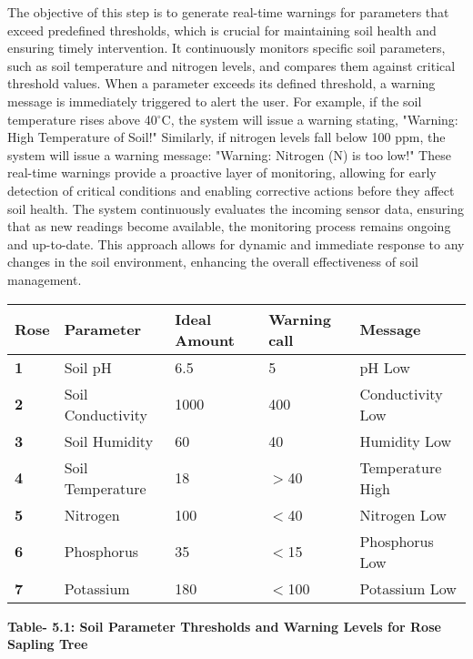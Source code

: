 \documentclass{book} %
\begin{document}
\noindent The objective of this step is to generate real-time warnings for parameters that exceed predefined thresholds, which is crucial for maintaining soil health and ensuring timely intervention. It continuously monitors specific soil parameters, such as soil temperature and nitrogen levels, and compares them against critical threshold values. When a parameter exceeds its defined threshold, a warning message is immediately triggered to alert the user. For example, if the soil temperature rises above 40$\mathrm{{}^\circ}$C, the system will issue a warning stating, "Warning: High Temperature of Soil!" Similarly, if nitrogen levels fall below 100 ppm, the system will issue a warning message: "Warning: Nitrogen (N) is too low!" These real-time warnings provide a proactive layer of monitoring, allowing for early detection of critical conditions and enabling corrective actions before they affect soil health. The system continuously evaluates the incoming sensor data, ensuring that as new readings become available, the monitoring process remains ongoing and up-to-date. This approach allows for dynamic and immediate response to any changes in the soil environment, enhancing the overall effectiveness of soil management.

\noindent 

\noindent 

\begin{tabular}{|p{0.7in}|p{0.8in}|p{0.8in}|p{0.7in}|p{0.8in}|} \hline 
\textbf{Rose} & \textbf{Parameter} & \textbf{Ideal Amount} & \textbf{Warning call} & \textbf{Message} \\ \hline 
\textbf{1} & Soil pH & 6.5 & 5 & pH Low \\ \hline 
\textbf{2} & Soil Conductivity & 1000 & 400 & Conductivity Low \\ \hline 
\textbf{3} & Soil Humidity & 60 & 40 & Humidity Low \\ \hline 
\textbf{4} & Soil Temperature & 18 & $\mathrm{>}$40 & Temperature High \\ \hline 
\textbf{5} & Nitrogen & 100 & $\mathrm{<}$40 & Nitrogen Low \\ \hline 
\textbf{6} & Phosphorus & 35 & $\mathrm{<}$15 & Phosphorus Low \\ \hline 
\textbf{7} & Potassium & 180 & $\mathrm{<}$100 & Potassium Low \\ \hline 
\end{tabular}

\textbf{Table- 5.1: Soil Parameter Thresholds and Warning Levels for Rose Sapling Tree}
\end{document}
